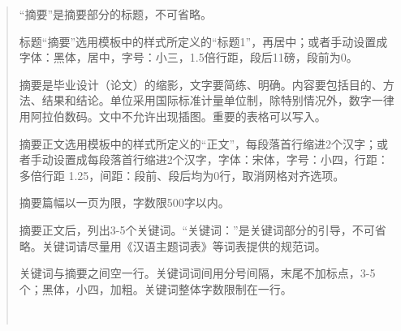 \setlength{\baselineskip}{20pt}
\begin{abstract}

“摘要”是摘要部分的标题，不可省略。\par
标题“摘要”选用模板中的样式所定义的“标题1”，再居中；或者手动设置成字体：黑体，居中，字号：小三，1.5倍行距，段后11磅，段前为0。\par
摘要是毕业设计（论文）的缩影，文字要简练、明确。内容要包括目的、方法、结果和结论。单位采用国际标准计量单位制，除特别情况外，数字一律用阿拉伯数码。文中不允许出现插图。重要的表格可以写入。\par
摘要正文选用模板中的样式所定义的“正文”，每段落首行缩进2个汉字；或者手动设置成每段落首行缩进2个汉字，字体：宋体，字号：小四，行距：多倍行距 1.25，间距：段前、段后均为0行，取消网格对齐选项。\par
摘要篇幅以一页为限，字数限500字以内。\par
摘要正文后，列出3-5个关键词。“关键词：”是关键词部分的引导，不可省略。关键词请尽量用《汉语主题词表》等词表提供的规范词。\par
关键词与摘要之间空一行。关键词词间用分号间隔，末尾不加标点，3-5个；黑体，小四，加粗。关键词整体字数限制在一行。\par

~\par		
\noindent{}
\end{abstract}